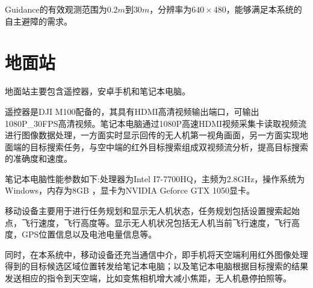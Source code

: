 Guidance的有效观测范围为$0.2m$到$30m$，分辨率为$640\times480$，能够满足本系统的自主避障的需求。



\section{地面站}

地面站主要包含遥控器，安卓手机和笔记本电脑。

遥控器是DJI M100配备的，其具有HDMI高清视频输出端口，可输出1080P_30FPS高清视频。笔记本电脑通过1080P高速HDMI视频采集卡读取视频流进行图像数据处理，一方面实时显示回传的无人机第一视角画面，另一方面实现地面端的目标搜索任务，与空中端的红外目标搜索组成双视频流分析，提高目标搜索的准确度和速度。

笔记本电脑性能参数如下:处理器为Intel I7-7700HQ，主频为2.8GHz，操作系统为Windows，内存为8GB ，显卡为NVIDIA Geforce GTX 1050显卡。

移动设备主要用于进行任务规划和显示无人机状态，任务规划包括设置搜索起始点，飞行速度，飞行高度等。显示无人机状况包括无人机当前飞行速度，飞行高度，GPS位置信息以及电池电量信息等。

同时，在本系统中，移动设备还充当通信中介，即手机将天空端利用红外图像处理得到的目标候选区域位置转发给笔记本电脑；以及笔记本电脑根据目标搜索的结果发送相应的指令到天空端，比如变焦相机增大减小焦距，无人机悬停拍照等。
